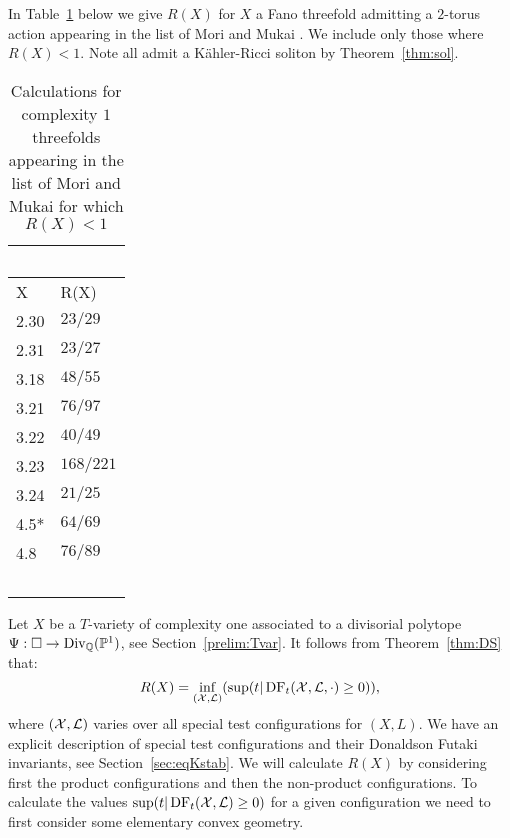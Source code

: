 \begin{corollary} \label{cor:R(X)}
In Table~\ref{table:name} below we give \(R(X)\) for \(X\) a Fano threefold  admitting a \(2\)-torus action appearing in the list of Mori and Mukai \cite{mori1981classification}. We include only those where \(R(X) <1\). Note all admit a K\"ahler-Ricci soliton by Theorem~\ref{thm:sol}.
\end{corollary}
\begin{table}[H] \centering
\begin{tabular}{l l}
\ & \ \\
\hline
X & R(X) \\
\hline
2.30 & \(23/29\) \\
2.31 & \(23/27\) \\
3.18 & \(48/55\) \\
3.21 & \(76/97\) \\
3.22 & \(40/49\) \\
3.23 & \(168/221\) \\
3.24 & \(21/25\) \\
4.5* & \(64/69\) \\
4.8 & \(76/89\) \\
\hline
\ & \ \\
\end{tabular}
\caption{Calculations for complexity \(1\) threefolds appearing in the list of Mori and Mukai for which \(R(X) <1\)} \label{table:name}
\end{table}
Let \(X\) be a \(T\)-variety of complexity one associated to a divisorial polytope \(\Psi: \Box \to \operatorname{Div}_{\mathbb{Q}}(\mathbb{P}^1)\), see Section~\ref{prelim:Tvar}.
It follows from Theorem~\ref{thm:DS} that: 
\begin{equation} \label{eq:R(X)inf}
R(X) = \inf_{({\mathcal{X}},\mathcal{L})}( \sup(t | \mathop{\rm DF}\nolimits_t({\mathcal{X}},\mathcal{L},\cdot) \ge 0) ),
\end{equation}
where \(({\mathcal{X}},\mathcal{L})\) varies over all special test configurations for \((X,L)\). We have an explicit description of special test configurations and their Donaldson Futaki invariants, see Section~\ref{sec:eqKstab}. We will calculate \(R(X)\) by considering first the product configurations and then the non-product configurations. To calculate the values \(\sup(t | \mathop{\rm DF}\nolimits_t({\mathcal{X}},\mathcal{L}) \ge 0)\) for a given configuration we need to first consider some elementary convex geometry.

